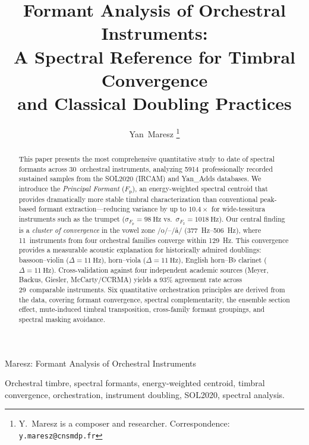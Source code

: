 \documentclass[journal]{IEEEtran}
\newcommand{\Fp}{F_\mathrm{p}}
\newcommand{\Fn}[1]{F_{#1}}
\begin{document}
\title{Formant Analysis of Orchestral Instruments:\\A Spectral Reference for Timbral Convergence\\and Classical Doubling Practices}

\author{Yan~Maresz%
\thanks{Y.~Maresz is a composer and researcher. Correspondence: \texttt{y.maresz@cnsmdp.fr}}%
}

%
{Maresz: Formant Analysis of Orchestral Instruments}

\maketitle

\begin{abstract}
This paper presents the most comprehensive quantitative study to date of spectral formants across 30~orchestral instruments, analyzing \num{5914}~professionally recorded sustained samples from the SOL2020 (IRCAM) and Yan\_Adds databases. We introduce the \emph{Principal Formant} ($\Fp$), an energy-weighted spectral centroid that provides dramatically more stable timbral characterization than conventional peak-based formant extraction---reducing variance by up to $10.4\times$ for wide-tessitura instruments such as the trumpet ($\sigma_{\Fp}=\SI{98}{\hertz}$ vs.\ $\sigma_{\Fn{2}}=\SI{1018}{\hertz}$). Our central finding is a \emph{cluster of convergence} in the vowel zone /o/--/\aa/ (\SIrange{377}{506}{\hertz}), where 11~instruments from four orchestral families converge within \SI{129}{\hertz}. This convergence provides a measurable acoustic explanation for historically admired doublings: bassoon--violin ($\Delta=\SI{11}{\hertz}$), horn--viola ($\Delta=\SI{11}{\hertz}$), English horn--B$\flat$ clarinet ($\Delta=\SI{11}{\hertz}$). Cross-validation against four independent academic sources (Meyer, Backus, Giesler, McCarty/CCRMA) yields a 93\% agreement rate across 29~comparable instruments. Six quantitative orchestration principles are derived from the data, covering formant convergence, spectral complementarity, the ensemble section effect, mute-induced timbral transposition, cross-family formant groupings, and spectral masking avoidance.
\end{abstract}

\begin{IEEEkeywords}
Orchestral timbre, spectral formants, energy-weighted centroid, timbral convergence, orchestration, instrument doubling, SOL2020, spectral analysis.
\end{IEEEkeywords}
\end{document}
